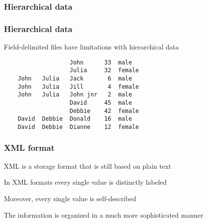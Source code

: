 \documentclass[12pt]{beamer}\usepackage[]{graphicx}\usepackage[]{color}
\begin{document}

\begin{frame}
\frametitle{Hierarchical data}
\begin{center}
\end{center}
\end{frame}


\begin{frame}[fragile]
\frametitle{Hierarchical data}

Field-delimited files have limitations with hierarchical data
\bigskip

\begin{verbatim}
                   John      33  male
                   Julia     32  female
    John   Julia   Jack       6  male
    John   Julia   Jill       4  female
    John   Julia   John jnr   2  male
                   David     45  male
                   Debbie    42  female
    David  Debbie  Donald    16  male
    David  Debbie  Dianne    12  female
\end{verbatim}

\end{frame}


\begin{frame}
\frametitle{XML format}

\bbi
  \item XML is a storage format that is still based on plain text
  \item In XML formats every single value is distinctly labeled
  \item Moreover, every single value is self-described
  \item The information is organized in a much more sophisticated manner
\ei
\eb

\end{frame}

\end{document}

